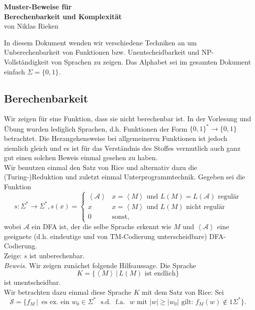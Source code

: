 \documentclass[11pt,a4paper]{article}
\begin{document}
\begin{center}
	\textbf{\large Muster-Beweise für\\Berechenbarkeit und Komplexit\"at}\\
	von Niklas Rieken\\[2em]
\end{center}
In diesem Dokument wenden wir verschiedene Techniken an um Unberechenbarkeit von Funktionen bzw. Unentscheidbarkeit und \textsf{NP}-Vollständigkeit von Sprachen zu zeigen. Das Alphabet sei im gesamten Dokument einfach \( \Sigma = \{ 0, 1 \} \).

\subsection*{Berechenbarkeit}
Wir zeigen für eine Funktion, dass sie nicht berechenbar ist. In der Vorlesung und Übung wurden lediglich Sprachen, {d.h.} Funktionen der Form \( \{0, 1\}^\ast \to \{0, 1\} \) betrachtet. Die Herangehensweise bei allgemeineren Funktionen ist jedoch ziemlich gleich und es ist für das Verständnis des Stoffes vermutlich auch ganz gut einen solchen Beweis einmal gesehen zu haben.\\
Wir benutzen einmal den Satz von Rice und alternativ dazu die (Turing-)Reduktion und zuletzt einmal Unterprogrammtechnik.
Gegeben sei die Funktion
\[
	s: \Sigma^\ast \to \Sigma^\ast, s(x) = \left\lbrace
		\begin{array}{cl}
			\left\langle \mathcal{A} \right\rangle & x = \left\langle M \right\rangle \text{ und } L(M) = L(\mathcal{A}) \text{ regul\"ar}\\
			x & x = \left\langle M \right\rangle \text{ und } L(M) \text{ nicht regul\"ar} \\
			0 & \text{sonst,}
			\end{array}
	\right.
\]
wobei \( \mathcal{A} \) ein DFA ist, der die selbe Sprache erkennt wie \( M \) und \( \left\langle \mathcal{A} \right\rangle \) eine geeignete ({d.h.} eindeutige und von TM-Codierung unterscheidbare) DFA-Codierung.\\
Zeige: \( s \) ist unberechenbar.\\
\textit{Beweis.} Wir zeigen zunächst folgende Hilfsaussage. Die Sprache
\[
	K = \{ \left\langle M \right\rangle \,\vert\, L(M) \text{ ist endlich} \}
\]
ist unentscheidbar.\\
Wir betrachten dazu einmal diese Sprache \( K \) mit dem Satz von Rice: Sei
\[
	\mathcal{S} = \{ f_M \,\vert\, \text{ es ex. ein } w_0 \in \Sigma^\ast \text{ {s.d.} {f.a.} } w \text { mit } \left| w \right| \geq \left| w_0 \right| \text{ gilt: } f_M(w) \notin 1\Sigma^\ast \}.
\]
\end{document}
